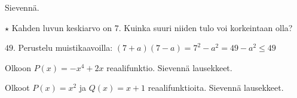 \begin{tehtavasivu}
\begin{tehtava}
    Sievennä.
    \begin{alakohdat}
    \end{alakohdat}
    \begin{vastaus}
        \begin{alakohdat}
        \end{alakohdat}
    \end{vastaus}
\end{tehtava}

\begin{tehtava} %
    $\star$ Kahden luvun keskiarvo on $7$. Kuinka suuri niiden tulo voi korkeintaan olla?
    \begin{vastaus}
        $49$. Perustelu muistikaavoilla: $(7+a)(7-a)=7^2-a^2 = 49-a^2 \leq 49$
    \end{vastaus}
\end{tehtava}

\begin{tehtava}
    Olkoon $P(x)=-x^4+2x$ reaalifunktio. Sievennä lausekkeet.
    \begin{alakohdat}
    \end{alakohdat}
    \begin{vastaus}
        \begin{alakohdat}
        \end{alakohdat}
    \end{vastaus}
\end{tehtava}

\begin{tehtava}
    Olkoot $P(x)=x^2$ ja $Q(x)=x+1$ reaalifunktioita. Sievennä lausekkeet.
    \begin{alakohdat}
    \end{alakohdat}
    \begin{vastaus}
        \begin{alakohdat}
        \end{alakohdat}
    \end{vastaus}
\end{tehtava}

\end{tehtavasivu}
